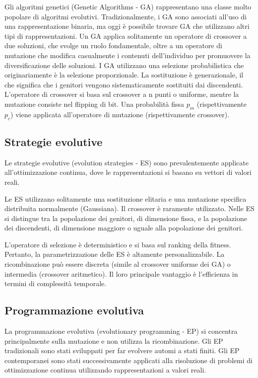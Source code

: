 Gli algoritmi genetici (Genetic Algorithms - GA) rappresentano una classe molto popolare di algoritmi evolutivi. Tradizionalmente, i GA sono associati all'uso di una rappresentazione binaria, ma oggi è possibile trovare GA che utilizzano altri tipi di rappresentazioni. Un GA applica solitamente un operatore di crossover a due soluzioni, che svolge un ruolo fondamentale, oltre a un operatore di mutazione che modifica casualmente i contenuti dell'individuo per promuovere la diversificazione delle soluzioni. I GA utilizzano una selezione probabilistica che originariamente è la selezione proporzionale. La sostituzione è generazionale, il che significa che i genitori vengono sistematicamente sostituiti dai discendenti. L'operatore di crossover si basa sul crossover a n punti o uniforme, mentre la mutazione consiste nel flipping di bit. Una probabilità fissa $p_m$ (rispettivamente $p_c$) viene applicata all'operatore di mutazione (rispettivamente crossover).

\subsection{Strategie evolutive}

Le strategie evolutive (evolution strategies - ES) sono prevalentemente applicate all'ottimizzazione continua, dove le rappresentazioni si basano su vettori di valori reali.

Le ES utilizzano solitamente una sostituzione elitaria e una mutazione specifica distribuita normalmente (Gaussiana). Il crossover è raramente utilizzato. Nelle ES si distingue tra la popolazione dei genitori, di dimensione fissa, e la popolazione dei discendenti, di dimensione maggiore o uguale alla popolazione dei genitori. 

L'operatore di selezione è deterministico e si basa sul ranking della fitness. Pertanto, la parametrizzazione delle ES è altamente personalizzabile. La ricombinazione può essere discreta (simile al crossover uniforme dei GA) o intermedia (crossover aritmetico). Il loro principale vantaggio è l'efficienza in termini di complessità temporale.

\subsection{Programmazione evolutiva}

La programmazione evolutiva (evolutionary programming - EP) si concentra principalmente sulla mutazione e non utilizza la ricombinazione. Gli EP tradizionali sono stati sviluppati per far evolvere automi a stati finiti. Gli EP contemporanei sono stati successivamente applicati alla risoluzione di problemi di ottimizzazione continua utilizzando rappresentazioni a valori reali.

